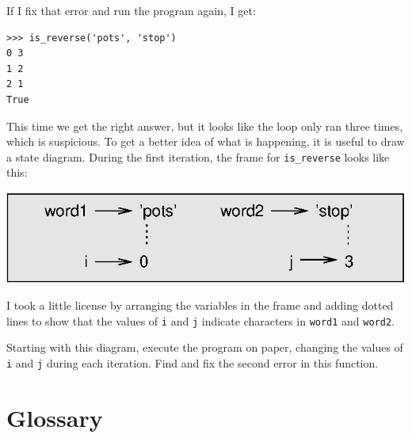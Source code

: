 \documentclass[10pt]{book}
\begin{document}

If I fix that error and run the program again, I get:

\beforeverb
\begin{verbatim}
>>> is_reverse('pots', 'stop')
0 3
1 2
2 1
True
\end{verbatim}
\afterverb
%
This time we get the right answer, but it looks like the loop only ran
three times, which is suspicious.  To get a better idea of what is
happening, it is useful to draw a state diagram.  During the first
iteration, the frame for \verb"is_reverse" looks like this:


\beforefig
\centerline{\includegraphics{figs/state4.eps}}
\afterfig

I took a little license by arranging the variables in the frame
and adding dotted lines to show that the values of {\tt i} and
{\tt j} indicate characters in {\tt word1} and {\tt word2}.

\begin{ex}
\label{is_reverse}
Starting with this diagram, execute the program on paper, changing the
values of {\tt i} and {\tt j} during each iteration.  Find and fix the
second error in this function.
\end{ex}



\section{Glossary}
\end{document}
